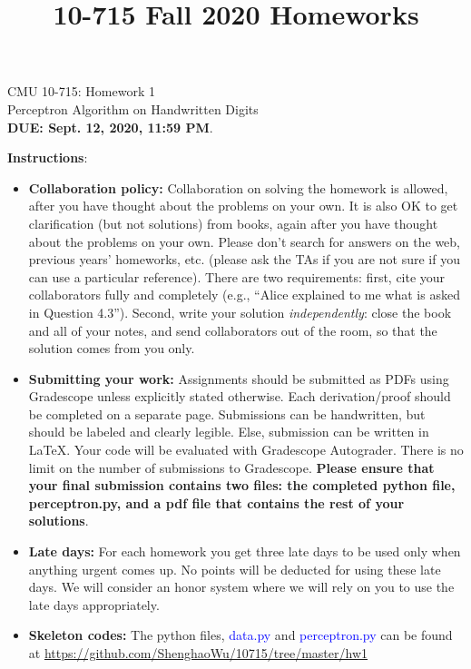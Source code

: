 \documentclass{article}
\title{10-715 Fall 2020 Homeworks}
\begin{document}
\begin{center}
{\Large CMU 10-715: Homework 1}\\
Perceptron Algorithm on Handwritten Digits \\
{\bf DUE: Sept. 12, 2020, 11:59 PM}.\\
\end{center}

\textbf{\large Instructions}:
\begin{itemize}
    \item \textbf{Collaboration policy:} Collaboration on solving the homework is allowed, after you have thought about the problems on your own. It is also OK to get clarification (but not solutions) from books, again after you have thought about the problems on your own. Please don’t search for answers on the web, previous years’ homeworks, etc. (please ask the TAs if you are not sure if you can use a particular reference). There are two requirements: first, cite your collaborators fully and completely (e.g., ``Alice explained to me what is asked in Question 4.3''). Second, write your solution \emph{independently}: close the book and all of your notes, and send collaborators out of the room, so that the solution comes from you only. 
    \item \textbf{Submitting your work:} Assignments should be submitted as PDFs using Gradescope unless explicitly stated otherwise. Each derivation/proof should be completed on a separate page. Submissions can be handwritten, but should be labeled and clearly legible. Else, submission can be written in LaTeX. Your code will be evaluated with Gradescope Autograder. There is no limit on the number of submissions to Gradescope.  \textbf{Please ensure that your final submission contains two files: the completed python file, perceptron.py, and a pdf file that contains the rest of your solutions}. 
    
    \item \textbf{Late days:} For each homework you get three late days to be used only when anything urgent comes up. No points will be deducted for using these late days. We will consider an honor system where we will rely on you to use the late days appropriately.
    
    \item \textbf{Skeleton codes:} The python files, \textcolor{blue}{data.py} and \textcolor{blue}{perceptron.py} can be found at \url{https://github.com/ShenghaoWu/10715/tree/master/hw1}
\end{itemize}





\newpage

\end{document}
